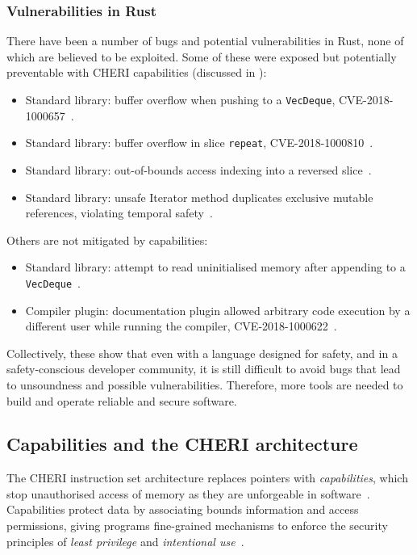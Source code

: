 \documentclass[dissertation.tex]{subfiles}
\begin{document}

\subsubsection{Vulnerabilities in Rust}
There have been a number of bugs and potential vulnerabilities in Rust,
none of which are believed to be exploited.
Some of these were exposed but potentially preventable with CHERI
capabilities (discussed in ):

\begin{itemize}
    \item Standard library: buffer overflow when pushing to a
    \texttt{VecDeque}, CVE-2018-1000657~\cite{cve-push,rust-issue-push}.
    \item Standard library: buffer overflow in slice \texttt{repeat},
    CVE-2018-1000810~\cite{cve-repeat,rust-advisory-repeat,rust-pr-slice}.
    \item Standard library: out-of-bounds access indexing into a
    reversed slice~\cite{rust-pr-reverse,rust-commit-reverse}.
    \item Standard library: unsafe Iterator method duplicates
    exclusive mutable references, violating temporal
    safety~\cite{rust-issue-vec-mut}.
\end{itemize}

Others are not mitigated by capabilities:

\begin{itemize}
    \item Standard library: attempt to read uninitialised memory after
    appending to a \texttt{VecDeque}~\cite{rust-issue-deque-append}.
    \item Compiler plugin: documentation plugin allowed arbitrary code
    execution by a different user while running the
    compiler, CVE-2018-1000622~\cite{cve-rustdoc,rust-advisory-rustdoc}.
\end{itemize}

Collectively, these show that even with a language designed for safety,
and in a safety-conscious developer community, it is still difficult to
avoid bugs that lead to unsoundness and possible vulnerabilities.
Therefore, more tools are needed to build and operate reliable and
secure software.


\subsection{Capabilities and the CHERI architecture}
The CHERI instruction set architecture replaces pointers with
\emph{capabilities}, which stop unauthorised access of memory as they are
unforgeable in software~\cite{cheri-v6}.
Capabilities protect data by associating bounds information and access
permissions, giving programs fine-grained mechanisms to enforce the
security principles of \emph{least privilege} and \emph{intentional
use}~\cite{neumann-principles}.
\end{document}
